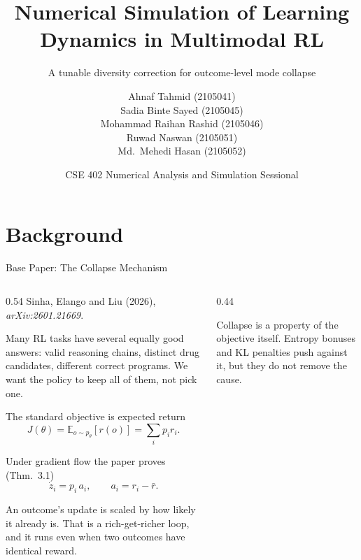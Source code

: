\documentclass[aspectratio=169,10pt]{beamer}
\title{Numerical Simulation of Learning Dynamics in Multimodal RL}
\subtitle{A tunable diversity correction for outcome-level mode collapse}
\author{%
  Ahnaf Tahmid (2105041)\\
  Sadia Binte Sayed (2105045)\\
  Mohammad Raihan Rashid (2105046)\\
  Ruwad Naswan (2105051)\\
  Md.\ Mehedi Hasan (2105052)}
\date{\vspace{1.5mm}CSE 402 Numerical Analysis and Simulation Sessional}
\institute{Department of Computer Science and Engineering, BUET}
\begin{document}
\maketitle

\section{Background}

\begin{frame}{Base Paper: The Collapse Mechanism}

\begin{columns}[T,onlytextwidth]
\begin{column}{0.54\textwidth}
\footnotesize
Sinha, Elango and Liu (2026), \emph{arXiv:2601.21669}.

\medskip
Many RL tasks have \alert{several equally good answers}: valid reasoning chains,
distinct drug candidates, different correct programs. We want the policy to keep
all of them, not pick one.

\medskip
The standard objective is expected return
\[
  J(\theta)=\mathbb{E}_{o\sim p_\theta}\!\left[r(o)\right]=\sum_i p_i r_i .
\]

Under gradient flow the paper proves (Thm.~3.1)
\[
  \dot z_i = p_i\,a_i,\qquad a_i = r_i-\bar r .
\]

\medskip
An outcome's update is scaled by \alert{how likely it already is}. That is a
rich-get-richer loop, and it runs even when two outcomes have identical reward.
\end{column}

\begin{column}{0.44\textwidth}
\centering
\vspace{2mm}

\vspace{4mm}
{\scriptsize\raggedright
Collapse is a property of \alert{the objective itself}. Entropy bonuses and KL
penalties push against it, but they do not remove the cause.\par}
\end{column}
\end{columns}
\end{frame}
\end{document}
